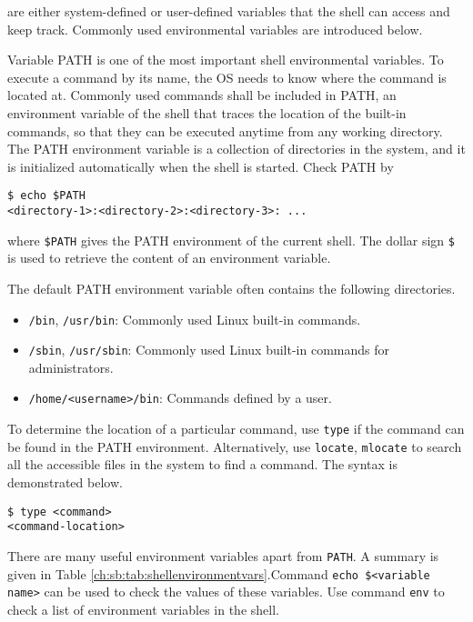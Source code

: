  are either system-defined or user-defined variables that the shell can access and keep track. Commonly used environmental variables are introduced below.

Variable PATH is one of the most important shell environmental variables. To execute a command by its name, the OS needs to know where the command is located at. Commonly used commands shall be included in PATH, an environment variable of the shell that traces the location of the built-in commands, so that they can be executed anytime from any working directory. The PATH environment variable is a collection of directories in the system, and it is initialized automatically when the shell is started. Check PATH by
\begin{lstlisting}
$ echo $PATH
<directory-1>:<directory-2>:<directory-3>: ...
\end{lstlisting}
where \verb|$PATH| gives the PATH environment of the current shell. The dollar sign \verb|$| is used to retrieve the content of an environment variable. 

The default PATH environment variable often contains the following directories. 
\begin{itemize}
\item \verb|/bin|, \verb|/usr/bin|: Commonly used Linux built-in commands.
\item \verb|/sbin|, \verb|/usr/sbin|: Commonly used Linux built-in commands for administrators.
\item \verb|/home/<username>/bin|: Commands defined by a user.
\end{itemize}
To determine the location of a particular command, use \verb|type| if the command can be found in the PATH environment. Alternatively, use \verb|locate|, \verb|mlocate| to search all the accessible files in the system to find a command. The syntax is demonstrated below.
\begin{lstlisting}
$ type <command>
<command-location>
\end{lstlisting}

There are many useful environment variables apart from \verb|PATH|. A summary is given in Table \ref{ch:sb:tab:shellenvironmentvars}.Command \verb|echo $<variable name>| can be used to check the values of these variables. Use command \verb|env| to check a list of environment variables in the shell.

